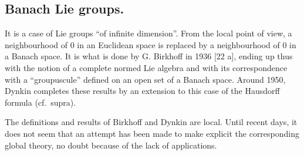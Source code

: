 \subsection{Banach Lie groups.}

It is a case of Lie groups ``of infinite dimension''. From the local point of view, a neighbourhood of 0 in an Euclidean space is replaced by a neighbourhood of 0 in a Banach space. It is what is done by G. Birkhoff in 1936 {[}22 a{]}, ending up thus with the notion of a complete normed Lie algebra and with its correspondence with a ``groupuscule'' defined on an open set of a Banach space. Around 1950, Dynkin completes these results by an extension to this case of the Hausdorff formula (cf.~supra).

The definitions and results of Birkhoff and Dynkin are local. Until recent days, it does not seem that an attempt has been made to make explicit the corresponding global theory, no doubt because of the lack of applications.
\relax{}
